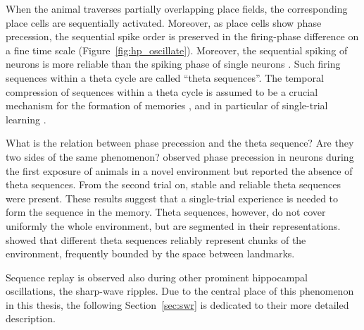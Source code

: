     When the animal traverses partially overlapping place fields, the
    corresponding place cells are sequentially activated. Moreover, as place
    cells show phase precession, the sequential spike order is preserved in the
    firing-phase difference on a fine time scale
    (Figure~\ref{fig:hp_oscillate}). Moreover, the sequential spiking of
    neurons is more reliable than the spiking phase of single neurons
    \citep{Dragoi2006}. Such firing sequences within a theta cycle are called
    ``theta sequences''. The temporal compression of sequences within a theta
    cycle is assumed to be a crucial mechanism for the formation of memories
    \citep{Skaggs1996}, and in particular of single-trial learning
    \citep{Rutishauser2006}. 
    
    What is the relation between phase precession and the theta sequence? Are
    they two sides of the same phenomenon? \cite{Feng2015} observed phase
    precession in neurons during the first exposure of animals in a novel
    environment but reported the absence of theta sequences. From the second
    trial on, stable and reliable theta sequences were present. These results
    suggest that a single-trial experience is needed to form the sequence in
    the memory. Theta sequences, however, do not cover uniformly the whole
    environment, but are segmented in their representations. \cite{Gupta2012}
    showed that different theta sequences reliably represent chunks of the
    environment, frequently bounded by the space between landmarks.

    Sequence replay is observed also during other prominent hippocampal
    oscillations, the sharp-wave ripples. Due to the central place of this
    phenomenon in this thesis, the following Section~\ref{sec:swr} is dedicated
    to their more detailed description.

